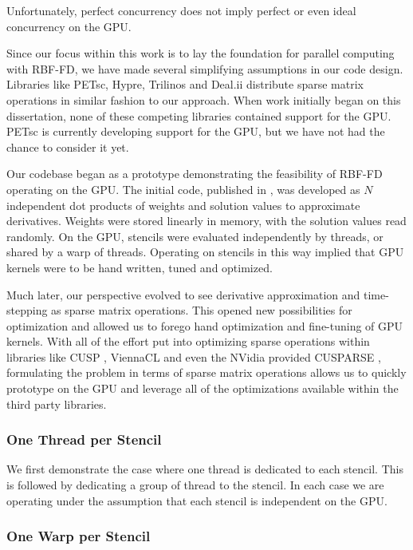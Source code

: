 \documentclass{report}
\begin{document}
Unfortunately, perfect concurrency does not imply perfect or even ideal concurrency on the GPU. 

Since our focus within this work is to lay the foundation for parallel computing
with RBF-FD, we have made several simplifying assumptions in our code design.
Libraries like PETsc, Hypre, Trilinos and Deal.ii distribute sparse matrix
operations in similar fashion to our approach. When work initially began on this
dissertation, none of these competing libraries contained support for the GPU.
PETsc is currently developing support for the GPU, but we have not had the
chance to consider it yet. 

Our codebase began as a prototype demonstrating the feasibility of RBF-FD
operating on the GPU. The initial code, published in \cite{BolligFlyerErlebacher2012}, was developed as $N$ independent dot
products of weights and solution values to approximate derivatives. Weights were
stored linearly in memory, with the solution values read randomly. On the GPU,
stencils were evaluated independently by threads, or shared by a warp of
threads. Operating on stencils in this way implied that GPU kernels were to be
hand written, tuned and optimized. 

Much later, our perspective evolved to see derivative approximation and
time-stepping as sparse matrix operations. This opened new possibilities for
optimization and allowed us to forego hand optimization and fine-tuning of GPU
kernels. With all of the effort put into optimizing sparse operations within
libraries like CUSP \cite{Bell2009}, ViennaCL \cite{Rupp2010} and even the
NVidia provided CUSPARSE \cite{CUSPARSE}, formulating the problem in terms of
sparse matrix operations allows us to quickly prototype on the GPU and leverage
all of the optimizations available within the third party libraries. 

\subsubsection{One Thread per Stencil}

We first demonstrate the case where one thread is dedicated to each stencil. This is followed by dedicating a group of thread to the stencil. In each case we are operating under the assumption that each stencil is independent on the GPU. 

\subsubsection{One Warp per Stencil}
\end{document}
